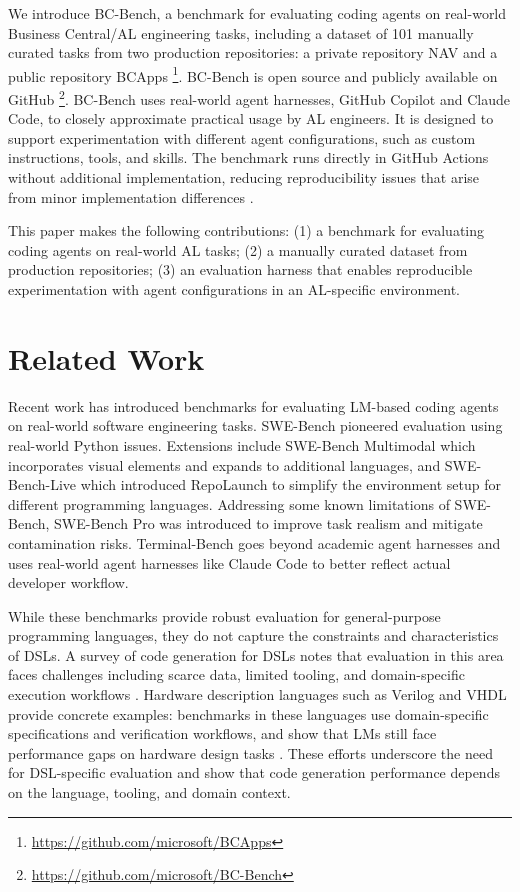 \documentclass{article}
\begin{document}
We introduce BC-Bench, a benchmark for evaluating coding agents on real-world Business Central/AL engineering tasks, including a dataset of 101 manually curated tasks from two production repositories: a private repository NAV and a public repository BCApps \footnote{\href{https://github.com/microsoft/BCApps}{https://github.com/microsoft/BCApps}}. BC-Bench is open source and publicly available on GitHub \footnote{\href{https://github.com/microsoft/BC-Bench}{https://github.com/microsoft/BC-Bench}}. BC-Bench uses real-world agent harnesses, GitHub Copilot and Claude Code, to closely approximate practical usage by AL engineers. It is designed to support experimentation with different agent configurations, such as custom instructions, tools, and skills. The benchmark runs directly in GitHub Actions without additional implementation, reducing reproducibility issues that arise from minor implementation differences \cite{biderman_lessons_2025}.

This paper makes the following contributions: (1) a benchmark for evaluating coding agents on real-world AL tasks; (2) a manually curated dataset from production repositories; (3) an evaluation harness that enables reproducible experimentation with agent configurations in an AL-specific environment.

\section{Related Work}

Recent work has introduced benchmarks for evaluating LM-based coding agents on real-world software engineering tasks. SWE-Bench \cite{jimenez_swe-bench_2024} pioneered evaluation using real-world Python issues. Extensions include SWE-Bench Multimodal \cite{yang_swe-bench_2024} which incorporates visual elements and expands to additional languages, and SWE-Bench-Live \cite{zhang_swe-bench_2025} which introduced RepoLaunch to simplify the environment setup for different programming languages. Addressing some known limitations of SWE-Bench, SWE-Bench Pro \cite{deng_swe-bench_2025} was introduced to improve task realism and mitigate contamination risks. Terminal-Bench \cite{merrill_terminal-bench_2026} goes beyond academic agent harnesses and uses real-world agent harnesses like Claude Code to better reflect actual developer workflow.

While these benchmarks provide robust evaluation for general-purpose programming languages, they do not capture the constraints and characteristics of DSLs. A survey of code generation for DSLs notes that evaluation in this area faces challenges including scarce data, limited tooling, and domain-specific execution workflows \cite{joel_survey_2025}. Hardware description languages such as Verilog and VHDL provide concrete examples: benchmarks in these languages use domain-specific specifications and verification workflows, and show that LMs still face performance gaps on hardware design tasks \cite{jin_realbench_2025, vijayaraghavan_vhdl-eval_2024}. These efforts underscore the need for DSL-specific evaluation and show that code generation performance depends on the language, tooling, and domain context.
\end{document}
